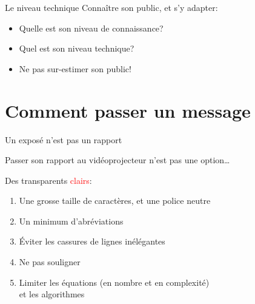 \documentclass[12pt]{beamer}
\begin{document}
\begin{frame}{Le niveau technique}
  \vspace*{-.2cm}
  Connaître son public, et s'y adapter:
  \begin{itemize}
    \item Quelle est son niveau de connaissance?
    \item Quel est son niveau technique?
    \item Ne pas sur-estimer son public!
  \end{itemize}

  \medskip
\end{frame}

\section{Comment passer un message}

\begin{frame}{Un exposé n'est pas un rapport}
  \begin{alertblock}{}
    Passer son rapport au vidéoprojecteur n'est pas une option\ldots
  \end{alertblock}

  \medskip

  Des transparents \textcolor{red}{clairs}:
  \begin{enumerate}
    \item<2-> Une grosse taille de caractères, et une police neutre
    \item<3-> Un minimum d'abréviations
    \item<4-> \'Eviter les cassures de lignes inélégantes
    \item<5-> Ne pas souligner
    \item<6-> Limiter les équations (en nombre et en complexité) \\  et les algorithmes
  \end{enumerate}
\end{frame}
\end{document}
